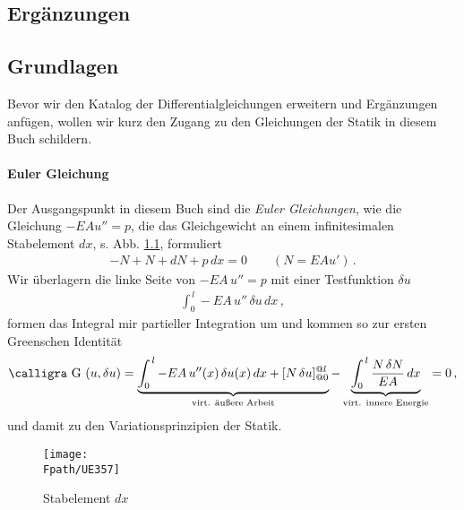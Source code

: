 \textcolor{chapterTitleBlue}{\chapter{Erg\"{a}nzungen}}

{\textcolor{sectionTitleBlue}{\section{Grundlagen}}}
Bevor wir den Katalog der Differentialgleichungen erweitern und Erg\"{a}nzungen anf\"{u}gen, wollen wir kurz den Zugang zu den Gleichungen der Statik in diesem Buch schildern.

{\textcolor{sectionTitleBlue}{\subsubsection*{Euler Gleichung}}}\label{Korrektur41}
Der Ausgangspunkt in diesem Buch sind die {\em Euler Gleichungen\/}, wie die Gleichung $- EA u'' = p$, die das Gleichgewicht an einem infinitesimalen Stab\-element  $dx$, s. Abb. \ref{UE357}, formuliert
\begin{align}
- N + N + dN + p\,dx = 0 \qquad (N = EA u')\,.
\end{align}
Wir \"{u}berlagern die linke Seite von $- EA\,u'' = p$ mit einer Testfunktion $\delta u$
\begin{align}\label{Eq173}
\int_0^{\,l} - EA\,u''\,\delta u\,dx \,,
\end{align}
formen das Integral mir partieller Integration um und kommen so zur ersten Greenschen Identit\"{a}t
\begin{align}
\text{\normalfont\calligra G\,\,}(u,{\delta u}) = \underbrace{\int_0^{\,l} - EA\,u''(x)\,{\delta u(x)}\,dx + [N\,{\delta u}]_{@0}^{@l}}_{\text{virt. \"{a}u{\ss}ere Arbeit}} - \underbrace{\int_0^{\,l} \frac{N\,{\delta N}}{EA}\,dx}_{\text{virt. innere Energie}} = 0\,,
\end{align}
und damit zu den Variationsprinzipien der Statik.
\begin{figure}[tbp]
\centering
\texttt{[image: \\Fpath/UE357]}
\caption{Stabelement $dx$}
\label{UE357}
\end{figure}%

